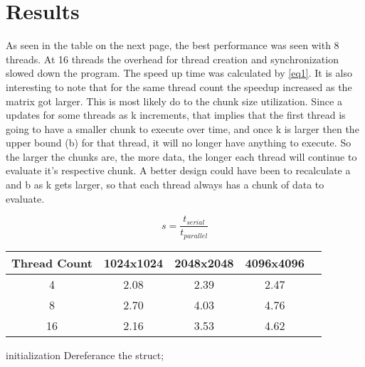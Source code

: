 \documentclass[12pt]{article}
\begin{document}
\vspace{-0.6cm}
\section{Results}
\vspace{-0.4cm}
\qquad As seen in the table on the next page, the best performance was seen
with 8 threads. At 16 threads the overhead for thread creation and
synchronization slowed down the program. The speed up time was calculated by
\eqref{eq1}. It is also interesting to note that for the same thread count
the speedup increased as the matrix got larger. This is most likely do to
the chunk size utilization. Since a updates for some threads as k
increments, that implies that the first thread is going to have a smaller
chunk to execute over time, and once k is larger then the upper bound (b) 
for that thread, it will no longer have anything to execute. So the larger
the chunks are, the more data, the longer each thread will continue to
evaluate it's respective chunk. A better design could have been to
recalculate a and b as k gets larger, so that each thread always has a chunk
of data to evaluate. 

\begin{equation}
    s = \frac{t_{serial}}{t_{parallel}}\label{eq1}
\end{equation}

\pagebreak

\begin{center}
\hspace*{-2.5cm}
\begin{tabular}{@{}|c|c|c|c|c|}
\hline
Thread Count & 1024x1024 & 2048x2048 & 4096x4096 \\
\hline
4 & 2.08 & 2.39 & 2.47 \\
\hline
8 & 2.70 & 4.03 & 4.76  \\
\hline 
16 & 2.16 & 3.53 & 4.62 \\
\hline
\end{tabular}
\hspace*{-2.5cm}
\end{center}

\vspace{1cm}
\begin{algorithm}[H]
\SetAlgoLined
{}
initialization\;
Dereferance the struct; 
\end{algorithm}

\end{document}

